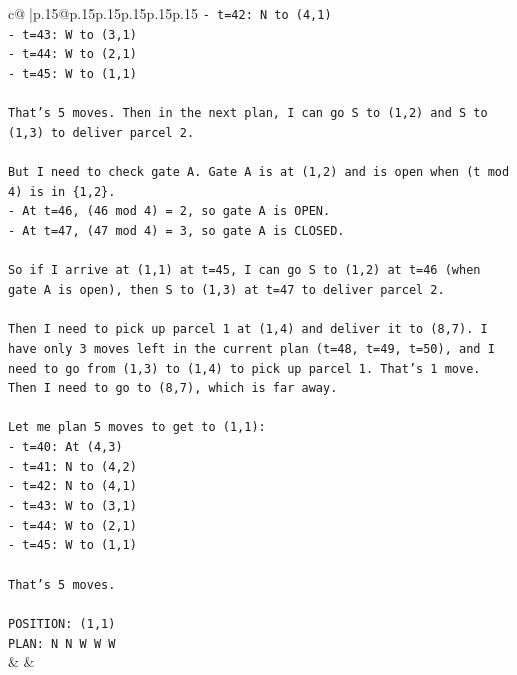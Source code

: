 \documentclass{article}
\begin{document}
{\begin{supertabular}{c@{$\;$}|p{.15\linewidth}@{}p{.15\linewidth}p{.15\linewidth}p{.15\linewidth}p{.15\linewidth}p{.15\linewidth}}
{{{\texttt{{-} t=42: N to (4,1)} \\
\texttt{{-} t=43: W to (3,1)} \\
\texttt{{-} t=44: W to (2,1)} \\
\texttt{{-} t=45: W to (1,1)} \\
\\ 
\texttt{That's 5 moves. Then in the next plan, I can go S to (1,2) and S to (1,3) to deliver parcel 2.} \\
\\ 
\texttt{But I need to check gate A. Gate A is at (1,2) and is open when (t mod 4) is in \{1,2\}.} \\
\texttt{{-} At t=46, (46 mod 4) = 2, so gate A is OPEN.} \\
\texttt{{-} At t=47, (47 mod 4) = 3, so gate A is CLOSED.} \\
\\ 
\texttt{So if I arrive at (1,1) at t=45, I can go S to (1,2) at t=46 (when gate A is open), then S to (1,3) at t=47 to deliver parcel 2.} \\
\\ 
\texttt{Then I need to pick up parcel 1 at (1,4) and deliver it to (8,7). I have only 3 moves left in the current plan (t=48, t=49, t=50), and I need to go from (1,3) to (1,4) to pick up parcel 1. That's 1 move. Then I need to go to (8,7), which is far away.} \\
\\ 
\texttt{Let me plan 5 moves to get to (1,1):} \\
\texttt{{-} t=40: At (4,3)} \\
\texttt{{-} t=41: N to (4,2)} \\
\texttt{{-} t=42: N to (4,1)} \\
\texttt{{-} t=43: W to (3,1)} \\
\texttt{{-} t=44: W to (2,1)} \\
\texttt{{-} t=45: W to (1,1)} \\
\\ 
\texttt{That's 5 moves.} \\
\\ 
\texttt{POSITION: (1,1)} \\
\texttt{PLAN: N N W W W} \\
            }
        }
    }
    & & \\ \\


\end{supertabular}}
\end{document}
